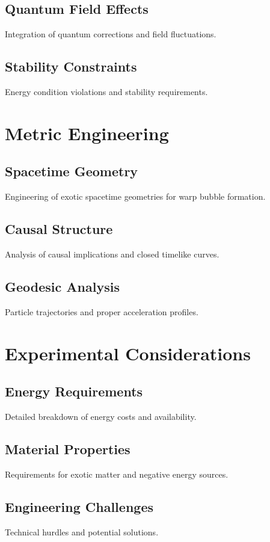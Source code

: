 \documentclass{article}
\begin{document}
\subsection{Quantum Field Effects}
Integration of quantum corrections and field fluctuations.

\subsection{Stability Constraints}
Energy condition violations and stability requirements.

\section{Metric Engineering}

\subsection{Spacetime Geometry}
Engineering of exotic spacetime geometries for warp bubble formation.

\subsection{Causal Structure}
Analysis of causal implications and closed timelike curves.

\subsection{Geodesic Analysis}
Particle trajectories and proper acceleration profiles.

\section{Experimental Considerations}

\subsection{Energy Requirements}
Detailed breakdown of energy costs and availability.

\subsection{Material Properties}
Requirements for exotic matter and negative energy sources.

\subsection{Engineering Challenges}
Technical hurdles and potential solutions.
\end{document}

